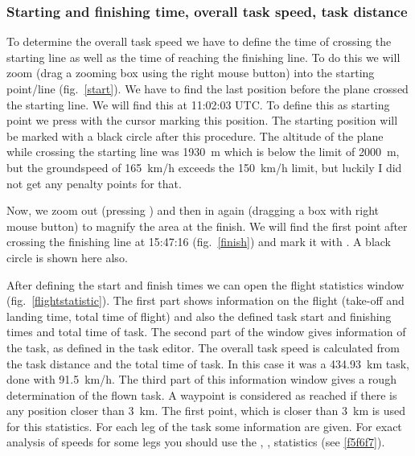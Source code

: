\subsubsection{Starting and finishing time, overall task speed, task distance}
To determine the overall task speed we have to define the time of crossing the starting line as well as the time of reaching the finishing line.
To do this we will zoom (drag a zooming box using the right mouse button) into the starting point/line (fig.~\ref{start}).
We have to find the last position before the plane crossed the starting line.
We will find this at 11:02:03 UTC. To define this as starting point we press  with the cursor marking this position.
The starting position will be marked with a black circle after this procedure.
The altitude of the plane while crossing the starting line was 1930~m which is below the limit of 2000~m, but the groundspeed of 165~km/h exceeds the 150~km/h limit,
but luckily I did not get any penalty points for that.

Now, we zoom out (pressing ) and then in again (dragging a box with right mouse button) to magnify the area at the finish.
We will find the first point after crossing the finishing line at 15:47:16 (fig.~\ref{finish}) and mark it with .
A black circle is shown here also.

After defining the start and finish times we can open the flight statistics window (fig.~\ref{flightstatistic}).
The first part shows information on the flight (take-off and landing time,
total time of flight) and also the defined task start and finishing times and total time of task.
The second part of the window gives information of the task, as defined in the task editor.
The overall task speed is calculated from the task distance and the total time of task.
In this case it was a 434.93~km task, done with 91.5~km/h. The third part of this information window gives a rough determination of the flown task.
A waypoint is considered as reached if there is any position closer than 3~km.
The first point, which is closer than 3~km is used for this statistics.
For each leg of the task some information are given. For exact analysis of speeds for some legs you should use the , ,  statistics (see \ref{f5f6f7}).

